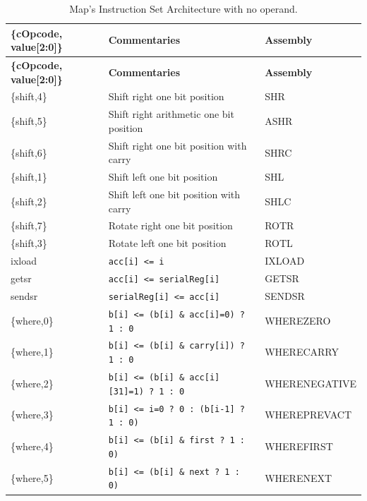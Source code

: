 \begin{table}[H]
\small
\centering
\begin{longtable}{|l|l|l|}
\caption{Map's Instruction Set Architecture with no operand.}
\label{tab:map_isa} \\
\hline
\textbf{\{cOpcode, value[2:0]\}} & \textbf{Commentaries} & \textbf{Assembly} \\
\hline
\endfirsthead
\hline
\textbf{\{cOpcode, value[2:0]\}} & \textbf{Commentaries} & \textbf{Assembly} \\
\hline
\endhead
\hline
\endfoot
\hline
\endlastfoot
\{shift,4\}   & Shift right one bit position                     & SHR            \\ \hline
\{shift,5\}   & Shift right arithmetic one bit position          & ASHR           \\ \hline
\{shift,6\}   & Shift right one bit position with carry          & SHRC           \\ \hline
\{shift,1\}   & Shift left one bit position                      & SHL            \\ \hline
\{shift,2\}   & Shift left one bit position with carry           & SHLC           \\ \hline
\{shift,7\}   & Rotate right one bit position                    & ROTR           \\ \hline
\{shift,3\}   & Rotate left one bit position                     & ROTL           \\ \hline
ixload        & \texttt{acc[i] <= i}                             & IXLOAD         \\ \hline
getsr         & \texttt{acc[i] <= serialReg[i]}                  & GETSR          \\ \hline
sendsr        & \texttt{serialReg[i] <= acc[i]}                  & SENDSR         \\ \hline
\{where,0\}   & \texttt{b[i] <= (b[i] \& acc[i]=0) ? 1 : 0}       & WHEREZERO      \\ \hline
\{where,1\}   & \texttt{b[i] <= (b[i] \& carry[i]) ? 1 : 0}       & WHERECARRY     \\ \hline
\{where,2\}   & \texttt{b[i] <= (b[i] \& acc[i][31]=1) ? 1 : 0}   & WHERENEGATIVE  \\ \hline
\{where,3\}   & \texttt{b[i] <= i=0 ? 0 : (b[i-1] ? 1 : 0)}       & WHEREPREVACT   \\ \hline
\{where,4\}   & \texttt{b[i] <= (b[i] \& first ? 1 : 0)}          & WHEREFIRST     \\ \hline
\{where,5\}   & \texttt{b[i] <= (b[i] \& next ? 1 : 0)}           & WHERENEXT      \\ \hline

\end{longtable}
\end{table}
